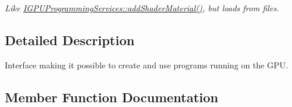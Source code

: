 \begin{DoxyCompactItemize}
\begin{DoxyCompactList}\small\item\em Like \hyperlink{classirr_1_1video_1_1IGPUProgrammingServices_af7c7515773d4be33e1c66b8e3b65c293}{I\+G\+P\+U\+Programming\+Services\+::add\+Shader\+Material()}, but loads from files. \end{DoxyCompactList}\end{DoxyCompactItemize}


\subsection{Detailed Description}
Interface making it possible to create and use programs running on the G\+PU. 

\subsection{Member Function Documentation}
\mbox{\label{classirr_1_1video_1_1IGPUProgrammingServices_a4a8d3b727ee9223d8baa353b82da0478}} 
